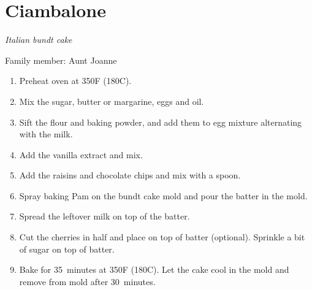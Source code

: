 \chapter{Ciambalone}
\label{ch:ciambalone}


\textit{Italian bundt cake}

Family member: Aunt Joanne

\begin{enumerate}
    \item Preheat oven at 350\degree F (180\degree C).
    \item Mix the sugar, butter or margarine, eggs and oil.
    \item Sift the flour and baking powder, and add them to egg mixture alternating with the milk.
    \item Add the vanilla extract and mix.
    \item Add the raisins and chocolate chips and mix with a spoon.
    \item Spray baking Pam on the bundt cake mold and pour the batter in the mold.
    \item Spread the leftover milk on top of the batter.
    \item Cut the cherries in half and place on top of batter (optional). Sprinkle a bit of sugar on top of batter.
    \item Bake for 35~minutes at 350\degree F (180\degree C). Let the cake cool in the mold and remove from mold after 30~minutes.
\end{enumerate}

